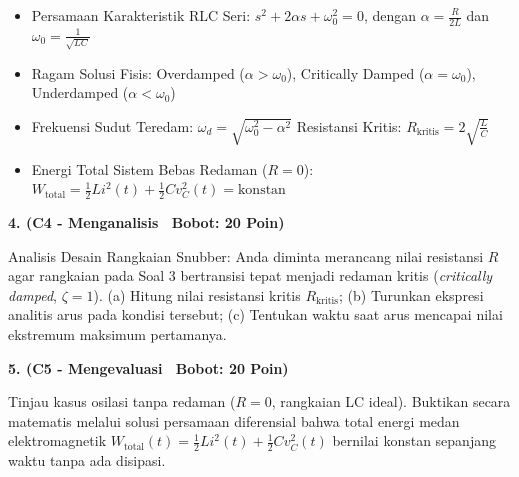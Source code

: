 \documentclass[10pt,a4paper]{article}
\begin{document}
\vfill

\begin{tcolorbox}[colback=unibblue!3,colframe=unibblue,colbacktitle=unibblue,coltitle=white,boxrule=0.6pt,arc=2pt,left=6pt,right=6pt,top=3pt,bottom=3pt,title=\textbf{\scriptsize FORMULA RUJUKAN TEKNIS \& STANDAR INDUSTRI TERKAIT}]
  \scriptsize
  \begin{itemize}[leftmargin=*, nosep]
  \item Persamaan Karakteristik RLC Seri: $s^2 + 2\alpha s + \omega_0^2 = 0$, dengan $\alpha = \frac{R}{2L}$ dan $\omega_0 = \frac{1}{\sqrt{LC}}$
  \item Ragam Solusi Fisis: Overdamped ($\alpha > \omega_0$), Critically Damped ($\alpha = \omega_0$), Underdamped ($\alpha < \omega_0$)
  \item Frekuensi Sudut Teredam: $\omega_d = \sqrt{\omega_0^2 - \alpha^2}$ \quad\textbar\quad Resistansi Kritis: $R_{\text{kritis}} = 2\sqrt{\frac{L}{C}}$
  \item Energi Total Sistem Bebas Redaman ($R=0$): $W_{\text{total}} = \frac{1}{2} L i^2(t) + \frac{1}{2} C v_C^2(t) = \text{konstan}$
\end{itemize}
\end{tcolorbox}

\newpage

\par
\vspace{1mm}

\noindent\textbf{4. (C4 - Menganalisis \textbar\ Bobot: 20 Poin)}\par\vspace{0.8mm}
{\footnotesize Analisis Desain Rangkaian Snubber: Anda diminta merancang nilai resistansi $R$ agar rangkaian pada Soal 3 bertransisi tepat menjadi redaman kritis (\textit{critically damped}, $\zeta = 1$). (a) Hitung nilai resistansi kritis $R_{\text{kritis}}$; (b) Turunkan ekspresi analitis arus pada kondisi tersebut; (c) Tentukan waktu saat arus mencapai nilai ekstremum maksimum pertamanya.}\par

\vspace{3.5mm}

\noindent\textbf{5. (C5 - Mengevaluasi \textbar\ Bobot: 20 Poin)}\par\vspace{0.8mm}
{\footnotesize Tinjau kasus osilasi tanpa redaman ($R=0$, rangkaian LC ideal). Buktikan secara matematis melalui solusi persamaan diferensial bahwa total energi medan elektromagnetik $W_{\text{total}}(t) = \frac{1}{2} L i^2(t) + \frac{1}{2} C v_C^2(t)$ bernilai konstan sepanjang waktu tanpa ada disipasi.}\par
\end{document}
